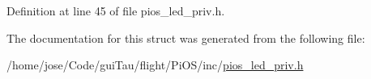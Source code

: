 Definition at line 45 of file pios\-\_\-led\-\_\-priv.\-h.



The documentation for this struct was generated from the following file\-:\begin{DoxyCompactItemize}
\item 
/home/jose/\-Code/gui\-Tau/flight/\-Pi\-O\-S/inc/\hyperlink{pios__led__priv_8h}{pios\-\_\-led\-\_\-priv.\-h}\end{DoxyCompactItemize}
